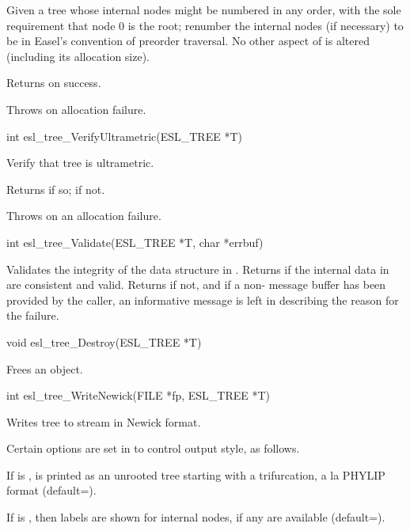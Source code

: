 \begin{sreapi}
Given a tree  whose internal nodes might be numbered in
any order, with the sole requirement that node 0 is the
root; renumber the internal nodes (if necessary) to be in Easel's
convention of preorder traversal. No other aspect of  is
altered (including its allocation size).

Returns  on success.

Throws  on allocation failure.



\hypertarget{func:esl_tree_VerifyUltrametric()}
{\item[int esl\_tree\_VerifyUltrametric(ESL\_TREE *T)]}

Verify that tree  is ultrametric. 

Returns  if so;  if not.

Throws  on an allocation failure.


\hypertarget{func:esl_tree_Validate()}
{\item[int esl\_tree\_Validate(ESL\_TREE *T, char *errbuf)]}

Validates the integrity of the data structure in .
Returns  if the internal data in  are
consistent and valid. Returns  if not,
and if a non- message buffer  has been
provided by the caller, an informative message is
left in  describing the reason for the 
failure.



\hypertarget{func:esl_tree_Destroy()}
{\item[void esl\_tree\_Destroy(ESL\_TREE *T)]}

Frees an  object.


\hypertarget{func:esl_tree_WriteNewick()}
{\item[int esl\_tree\_WriteNewick(FILE *fp, ESL\_TREE *T)]}

Writes tree  to stream  in Newick format.

Certain options are set in  to control output style, 
as follows.

If  is ,  is printed as an
unrooted tree starting with a trifurcation, a la PHYLIP
format (default=).

If  is , then labels are
shown for internal nodes, if any are available
(default=).


\end{sreapi}
